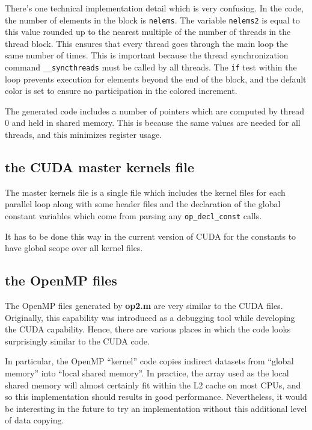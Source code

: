 \documentclass[12pt]{article}
\begin{document}
There's one technical implementation detail which is very confusing.
In the code, the number of elements in the block is {\tt nelems}.
The variable {\tt nelems2} is equal to this value rounded up to the
nearest multiple of the number of threads in the thread block.
This ensures that every thread goes through the main loop the same
number of times.  This is important because the thread synchronization
command {\tt \_\_syncthreads} must be called by all threads.
The {\tt if} test within the loop prevents execution for elements
beyond the end of the block, and the default color is set to ensure
no participation in the colored increment.

The generated code includes a number of pointers which are computed
by thread 0 and held in shared memory.  This is because the same values
are needed for all threads, and this minimizes register usage.

\subsection{the CUDA master kernels file}

The master kernels file is a single file which includes the kernel
files for each parallel loop along with some header files and the
declaration of the global constant variables which come from parsing
any {\tt op\_decl\_const} calls.

It has to be done this way in the current version of CUDA for the
constants to have global scope over all kernel files.


\subsection{the OpenMP files}

The OpenMP files generated by {\bf op2.m} are very similar to the
CUDA files.  Originally, this capability was introduced as a debugging
tool while developing the CUDA capability.  Hence, there are various
places in which the code looks surprisingly similar to the CUDA code.

In particular, the OpenMP ``kernel'' code copies indirect datasets
from ``global memory'' into ``local shared memory''.  In practice,
the array used as the local shared memory will almost certainly fit
within the L2 cache on most CPUs, and so this implementation should
results in good performance.  Nevertheless, it would be interesting
in the future to try an implementation without this additional level
of data copying.
\end{document}

